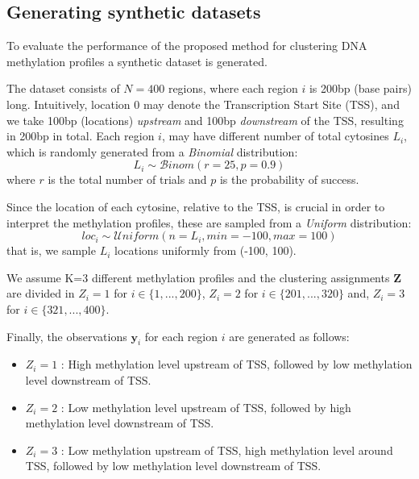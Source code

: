 \subsection{Generating synthetic datasets} \label{meth-synth-data-subsect}
To evaluate the performance of the proposed method for clustering DNA methylation profiles a synthetic dataset is generated. 

The dataset consists of $N=400$ regions, where each region $i$ is 200bp (base pairs) long. Intuitively, location 0 may denote the Transcription Start Site (TSS), and we take 100bp (\ie locations) \emph{upstream} and 100bp \emph{downstream} of the TSS, resulting in 200bp in total. Each region $i$, may have different number of total cytosines $L_{i}$, which is randomly generated from a \emph{Binomial} distribution:
\begin{equation}
	L_{i} \sim \mathcal{B}inom(r=25, p=0.9)
\end{equation}
where $r$ is the total number of trials and $p$ is the probability of success.

Since the location of each cytosine, relative to the TSS, is crucial in order to interpret the methylation profiles, these are sampled from a \emph{Uniform} distribution:
\begin{equation}
	loc_{i} \sim \mathcal{U}niform(n=L_{i}, min=-100, max=100)
\end{equation}
that is, we sample $L_{i}$ locations uniformly from (-100, 100). 

We assume K=3 different methylation profiles and the clustering assignments $\mathbf{Z}$ are divided in $Z_{i}=1$ for $i \in \lbrace 1,...,200 \rbrace$, $Z_{i}=2$ for $i \in \lbrace 201,...,320 \rbrace$ and, $Z_{i}=3$ for $i \in \lbrace 321,...,400 \rbrace$. 

Finally, the observations $\mathbf{y}_{i}$ for each region $i$ are generated as follows:
\begin{itemize}
	\item{
		$Z_{i}=1$ : High methylation level upstream of TSS, followed by low methylation level downstream of TSS.
	}
	\item{ 
		$Z_{i}=2$ : Low methylation level upstream of TSS, followed by high methylation level downstream of TSS.
	}
	\item{ 
		$Z_{i}=3$ : Low methylation upstream of TSS, high methylation level around TSS, followed by low methylation level downstream of TSS.
	}
\end{itemize}

